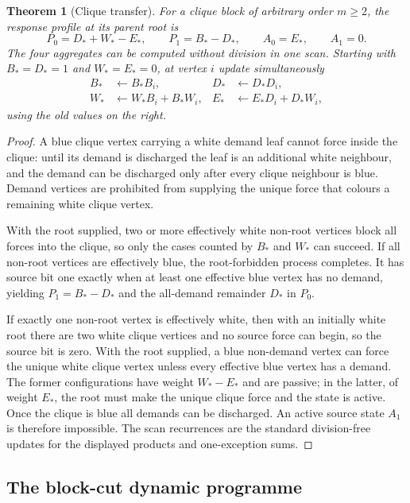 \documentclass[11pt,reqno]{amsart}
\newtheorem{theorem}{Theorem}[section]
\theoremstyle{definition}
\begin{document}
\begin{theorem}[Clique transfer]\label{thm:clique-transfer}
For a clique block of arbitrary order $m\ge2$, the response profile at its
parent root is
\[
  \boxed{
  P_0=D_*+W_*-E_*,\qquad
  P_1=B_*-D_*,\qquad
  A_0=E_*,\qquad
  A_1=0.
  }
\]
The four aggregates can be computed without division in one scan.  Starting
with $B_*=D_*=1$ and $W_*=E_*=0$, at vertex $i$ update simultaneously
\begin{align*}
  B_*&\leftarrow B_*B_i,
  &D_*&\leftarrow D_*D_i,\\
  W_*&\leftarrow W_*B_i+B_*W_i,
  &E_*&\leftarrow E_*D_i+D_*W_i,
\end{align*}
using the old values on the right.
\end{theorem}

\begin{proof}
A blue clique vertex carrying a white demand leaf cannot force inside the
clique: until its demand is discharged the leaf is an additional white
neighbour, and the demand can be discharged only after every clique neighbour
is blue.  Demand vertices are prohibited from supplying the unique force
that colours a remaining white clique vertex.

With the root supplied, two or more effectively white non-root vertices block
all forces into the clique, so only the cases counted by $B_*$ and $W_*$ can
succeed.  If all non-root vertices are effectively blue, the root-forbidden
process completes.  It has source bit one exactly when at least one effective
blue vertex has no demand, yielding $P_1=B_*-D_*$ and the all-demand remainder
$D_*$ in $P_0$.

If exactly one non-root vertex is effectively white, then with an initially
white root there are two white clique vertices and no source force can begin,
so the source bit is zero.  With the root supplied, a blue non-demand vertex
can force the unique white clique vertex unless every effective blue vertex
has a demand.  The former configurations have weight $W_*-E_*$ and are
passive; in the latter, of weight $E_*$, the root must make the unique clique
force and the state is active.  Once the clique is blue all demands can be
discharged.  An active source state $A_1$ is therefore impossible.  The scan
recurrences are the standard division-free updates for the displayed products
and one-exception sums.
\end{proof}

\subsection{The block-cut dynamic programme}
\end{document}
